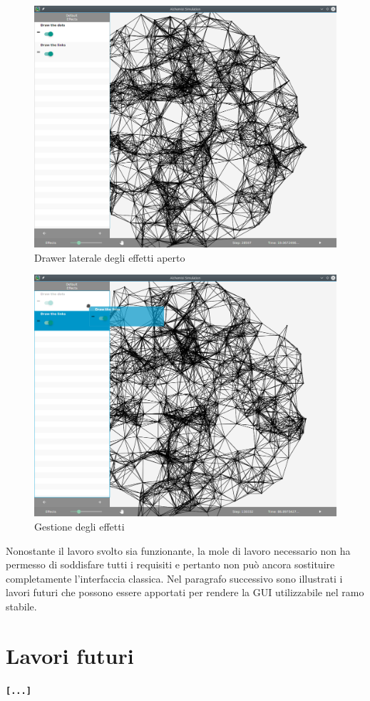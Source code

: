         \begin{figure}[htbp]
            \centering
            \includegraphics[scale=0.45]{img/withNodes/simWithEff}
            \caption{Drawer laterale degli effetti aperto}
            \label{fig:simWithEff}
        \end{figure}

        \begin{figure}[htbp]
            \centering
            \includegraphics[scale=0.45]{img/withNodes/simWithDnD}
            \caption{Gestione  degli effetti}
            \label{fig:simWithDnD}
        \end{figure}

        Nonostante il lavoro svolto sia funzionante, la mole di lavoro necessario non ha permesso di soddisfare tutti i requisiti e pertanto non può ancora sostituire completamente l'interfaccia classica. Nel paragrafo successivo sono illustrati i lavori futuri che possono essere apportati per rendere la GUI utilizzabile nel ramo stabile.

    \section{Lavori futuri}\label{sec:futuro}
        \textbf{\texttt{[...]}}

